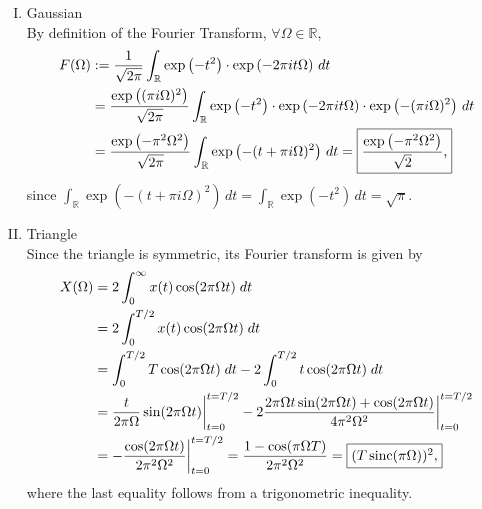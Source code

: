 \documentclass[11pt]{article}
\newcommand{\R}{\mathbb{R}} %
\newcommand{\sinc}{\operatorname{sinc}}
\begin{document}
\begin{enumerate}[I.]
\item Gaussian \\
By definition of the Fourier Transform, $\forall \Omega \in \R$,
\begin{align*}
F(\Omega)
 & :=   \frac{1}{\sqrt{2\pi}} \int_{\R} \exp\left( -t^2 \right)
            \cdot \exp\left( -2\pi it\Omega \right) \, dt               \\
 & =    \frac{\exp \left( (\pi i \Omega)^2 \right)}{\sqrt{2\pi}}
            \int_{\R} \exp\left( -t^2 \right)
                \cdot \exp\left( -2\pi it\Omega \right)
                    \cdot \exp\left( -(\pi i \Omega)^2 \right) \, dt    \\
 & =    \frac{\exp \left( -\pi^2 \Omega^2 \right)}{\sqrt{2\pi}}
            \int_{\R} \exp\left( -(t + \pi i \Omega)^2 \right) \, dt
   =    \mbox{\fbox{$\displaystyle
            \frac{\exp \left( -\pi^2 \Omega^2 \right)}{\sqrt{2}}
        $,}}
\end{align*}
since
$\displaystyle
   \int_{\R} \exp\left( -(t + \pi i \Omega)^2 \right) \, dt
 = \int_{\R} \exp\left( -t^2 \right) \, dt
 = \sqrt{\pi}
$.

\item Triangle \\
Since the triangle is symmetric, its Fourier transform is given by
\begin{align*}
X(\Omega)
 & = 2\int_0^{\infty} x(t) \cos(2\pi\Omega t) \; dt \\
 & = 2\int_0^{T/2} x(t) \cos(2\pi\Omega t) \; dt    \\
 & = \int_0^{T/2} T \cos(2\pi\Omega t) \; dt
        - 2\int_0^{T/2} t \cos(2 \pi\Omega t) \; dt    \\
 & = \frac{t}{2\pi\Omega} \sin(2\pi\Omega t) \bigg|_{t = 0}^{t = T/2}
        - 2\frac{2\pi\Omega t \sin(2\pi\Omega t) + \cos(2\pi\Omega t)}
            {4\pi^2\Omega^2} \bigg|_{t = 0}^{t = T/2} \\
 & = -\frac{\cos(2\pi\Omega t)} {2\pi^2\Omega^2} \bigg|_{t = 0}^{t = T/2}
   = \frac{1 - \cos(\pi\Omega T)} {2\pi^2\Omega^2}
   = \mbox{\fbox{$(T\sinc(\pi\Omega))^2$,}}
\end{align*}
where the last equality follows from a trigonometric inequality.


\end{enumerate}
\end{document}
